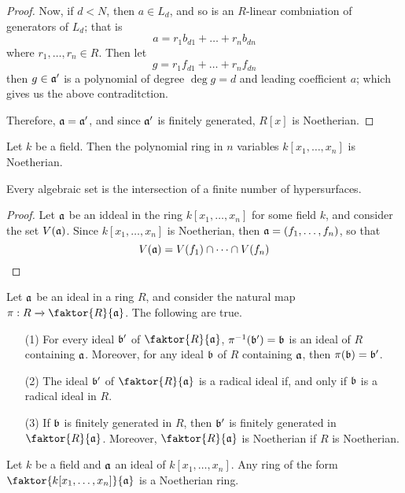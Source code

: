 \begin{proof}
     Now, if $d<N$, then  $a \in L_d$, and so is an  $R$-linear combniation of
     generators of  $L_d$; that is
     \begin{equation*}
         a=r_1b_{d1}+\dots+r_nb_{dn}
     \end{equation*}
     where $r_1, \dots, r_n \in R$. Then let
     \begin{equation*}
         g=r_1f_{d1}+\dots+r_nf_{dn}
     \end{equation*}
     then $g \in \af'$ is a polynomial of degree  $\deg{g}=d$ and leading
     coefficient $a$; which gives us the above contraditction.

     Therefore, $\af=\af'$, and since $\af'$ is finitely generated,  $R[x]$ is
     Noetherian.
 \end{proof}
 \begin{corollary}
     Let $k$ be a field. Then the polynomial ring in  $n$ variables  $k[x_1,
     \dots, x_n]$ is Noetherian.
 \end{corollary}

 \begin{theorem}\label{1.4.2}
     Every algebraic set is the intersection of a finite number of
     hypersurfaces.
 \end{theorem}
 \begin{proof}
     Let $\af$ be an iddeal in the ring $k[x_1, \dots, x_n]$ for some field $k$,
     and consider the set $V(\af)$. Since $k[x_1, \dots, x_n]$ is Noetherian,
     then $\af=(f_1, \dots, f_n)$, so that
     \begin{equation*}
         V(\af)=V(f_1) \cap \dots \cap V(f_n)
     \end{equation*}
 \end{proof}

 \begin{theorem}\label{1.4.3}
     Let $\af$ be an ideal in a ring $R$, and consider the natural map $\pi:R
     \xrightarrow{} \faktor{R}{\af}$. The following are true.
     \begin{enumerate}
         \item[(1)] For every ideal $\bf'$ of $\faktor{R}{\af}$,
             $\inv{\pi}(\bf')=\bf$ is an ideal of $R$ containing $\af$.
             Moreover, for any ideal $\bf$ of $R$ containing $\af$, then
             $\pi(\bf)=\bf'$.

         \item[(2)] The ideal $\bf'$ of $\faktor{R}{\af}$ is a radical ideal if,
             and only if $\bf$ is a radical ideal in $R$.

         \item[(3)] If $\bf$ is finitely generated in $R$, then $\bf'$ is
             finitely generated in $\faktor{R}{\af}$. Moreover,
             $\faktor{R}{\af}$ is Noetherian if $R$ is Noetherian.
     \end{enumerate}
 \end{theorem}
 \begin{corollary}
     Let $k$ be a field and $\af$ an ideal of $k[x_1, \dots, x_n]$. Any ring of
     the form $\faktor{k[x_1, \dots, x_n]}{\af}$ is a Noetherian ring.
 \end{corollary}
